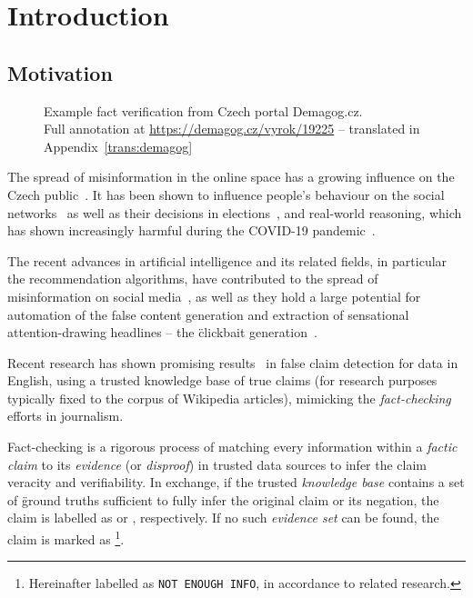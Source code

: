 
\chapter{Introduction}
\label{chap:intro}
\section{Motivation}
\label{sec:motivation}

\begin{figure}
\centering
\caption[Example fact verification from Czech portal Demagog.cz]{Example fact verification from Czech portal \textsf{Demagog.cz}.\\
Full annotation at \url{https://demagog.cz/vyrok/19225} -- translated in Appendix~\ref{trans:demagog}}
\label{fig:demagog}
\end{figure}
The spread of misinformation in the online space has a growing influence on the Czech public~\cite{stem}. It has been shown to influence people's behaviour on the social networks~\cite{Lazer1094} as well as their decisions in elections~\cite{10.1257/jep.31.2.211}, and real-world reasoning, which has shown increasingly harmful during the COVID-19 pandemic~\cite{BARUA2020100119}.

The recent advances in artificial intelligence and its related fields, in particular the recommendation algorithms, have contributed to the spread of misinformation on social media~\cite{doi:10.1177/2056305119888654}, as well as they hold a large potential for automation of the false content generation and extraction of sensational attention-drawing headlines -- the \"{clickbait} generation~\cite{shukai}.

Recent research has shown promising results~\cite{fever2} in false claim detection for data in English, using a trusted knowledge base of true claims (for research purposes typically fixed to the corpus of \textsf{Wikipedia} articles), mimicking the \textit{fact-checking} efforts in journalism.

Fact-checking is a rigorous process of matching every information within a \textit{factic claim} to its \textit{evidence} (or \textit{disproof}) in trusted data sources to infer the claim veracity and verifiability. In exchange, if the trusted \textit{knowledge base} contains a set of \"{ground truths} sufficient to fully infer the original claim or its negation, the claim is labelled as {} or {}, respectively. If no such \textit{evidence set} can be found, the claim is marked as {}\footnote{Hereinafter labelled as \texttt{NOT ENOUGH INFO}, in accordance to related research.}.


